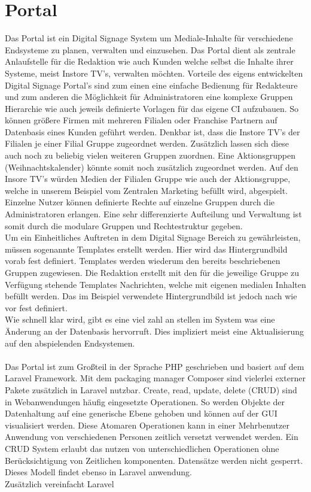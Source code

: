 \section{Portal}
\label{sec:Portal}
Das Portal ist ein Digital Signage System um Mediale-Inhalte für verschiedene Endsysteme zu planen, verwalten und einzusehen. Das Portal dient als zentrale Anlaufstelle für die Redaktion wie auch Kunden welche selbst die Inhalte ihrer Systeme, meist Instore TV's, verwalten möchten. Vorteile des eigens entwickelten Digital Signage Portal's sind zum einen eine einfache Bedienung für Redakteure und zum anderen die Möglichkeit für Administratoren eine komplexe Gruppen Hierarchie wie auch jeweils definierte Vorlagen für das eigene CI aufzubauen. So können größere Firmen mit mehreren Filialen oder Franchise Partnern auf Datenbasis eines Kunden geführt werden. Denkbar ist, dass die Instore TV's der Filialen je einer Filial Gruppe zugeordnet werden. Zusätzlich lassen sich diese auch noch zu beliebig vielen weiteren Gruppen zuordnen. Eine Aktionsgruppen (\zB Weihnachtskalender) könnte somit noch zusätzlich zugeordnet werden. Auf den Insore TV's würden Medien der Filialen Gruppe wie auch der Aktionsgruppe, welche in unserem Beispiel vom Zentralen Marketing befüllt wird, abgespielt. 
Einzelne Nutzer können definierte Rechte auf einzelne Gruppen durch die Administratoren erlangen. Eine sehr differenzierte Aufteilung und Verwaltung ist somit durch die modulare Gruppen und Rechtestruktur gegeben.
\\Um ein Einheitliches Auftreten in dem Digital Signage Bereich zu gewährleisten, müssen sogenannte Templates erstellt werden. Hier wird \zB das Hintergrundbild vorab fest definiert. Templates werden wiederum den bereits beschriebenen Gruppen zugewiesen. Die Redaktion erstellt mit den für die jeweilige Gruppe zu Verfügung stehende Templates Nachrichten, welche mit eigenen medialen Inhalten befüllt werden. Das im Beispiel verwendete Hintergrundbild ist jedoch nach wie vor fest definiert.
\\Wie schnell klar wird, gibt es eine viel zahl an stellen im System was eine Änderung an der Datenbasis hervorruft. Dies impliziert meist eine Aktualisierung auf den abspielenden Endsystemen. 
\\\\Das Portal ist zum Großteil in der Sprache PHP geschrieben und basiert auf dem Laravel Framework. Mit dem packaging manager Composer sind vielerlei externer Pakete zusätzlich in Laravel nutzbar. Create, read, update, delete (CRUD) sind in Webanwendungen häufig eingesetzte Operationen. So werden Objekte der Datenhaltung auf eine generische Ebene gehoben und können auf der GUI visualisiert werden. Diese Atomaren Operationen kann in einer Mehrbenutzer Anwendung von verschiedenen Personen zeitlich versetzt verwendet werden. Ein CRUD System erlaubt das nutzen von unterschiedlichen Operationen ohne Berücksichtigung von Zeitlichen komponenten. Datensätze werden nicht gesperrt. Dieses Modell findet ebenso in Laravel anwendung. \\Zusätzlich vereinfacht Laravel 
